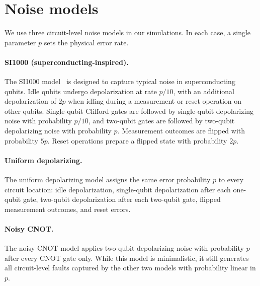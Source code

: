 \documentclass[twocolumn,
aps,
prx,
showpacs,
amsmath,
amssymb,
floatfix,
longbibliography,
superscriptaddress,
eprint]
{revtex4-1}
\begin{document}
\appendix

\section{Noise models}
\label{sec:noise_models}

We use three circuit-level noise models in our simulations. In each case, a single parameter $p$ sets the physical error rate.

\paragraph{SI1000 (superconducting-inspired).}
The SI1000 model~\cite{Gidney2021faulttolerant} is designed to capture typical noise in superconducting qubits.
Idle qubits undergo depolarization at rate $p/10$, with an additional depolarization of $2p$ when idling during a measurement or reset operation on other qubits.
Single-qubit Clifford gates are followed by single-qubit depolarizing noise with probability $p/10$, and two-qubit gates are followed by two-qubit depolarizing noise with probability $p$.
Measurement outcomes are flipped with probability $5p$.
Reset operations prepare a flipped state with probability $2p$.

\paragraph{Uniform depolarizing.}
The uniform depolarizing model assigns the same error probability $p$ to every circuit location: idle depolarization, single-qubit depolarization after each one-qubit gate, two-qubit depolarization after each two-qubit gate, flipped measurement outcomes, and reset errors.

\paragraph{Noisy CNOT.}
The noisy-CNOT model applies two-qubit depolarizing noise with probability $p$ after every CNOT gate only.
While this model is minimalistic, it still generates all circuit-level faults captured by the other two models with probability linear in $p$.


\end{document}
